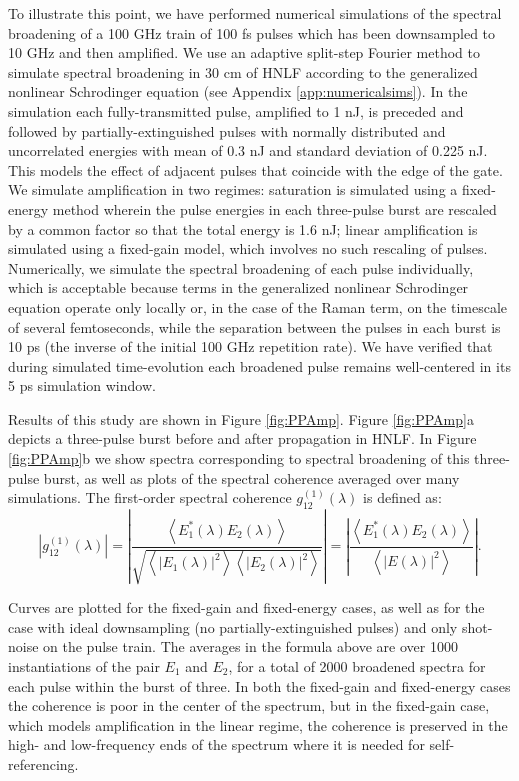 To illustrate this point, we have performed numerical simulations of the spectral broadening of a 100 GHz train of 100 fs pulses which has been downsampled to 10 GHz and then amplified. We use an adaptive \cite{Heidt2009} split-step Fourier method \cite{Hult2007} to simulate spectral broadening in 30 cm of HNLF according to the generalized nonlinear Schrodinger equation \cite{Agrawal2007} (see Appendix \ref{app:numericalsims}). In the simulation each fully-transmitted pulse, amplified to 1 nJ, is preceded and followed by partially-extinguished pulses with normally distributed and uncorrelated energies with mean of 0.3 nJ and standard deviation of 0.225 nJ. This models the effect of adjacent pulses that coincide with the edge of the gate. We simulate amplification in two regimes: saturation is simulated using a fixed-energy method wherein the pulse energies in each three-pulse burst are rescaled by a common factor so that the total energy is 1.6 nJ; linear amplification is simulated using a fixed-gain model, which involves no such rescaling of pulses. Numerically, we simulate the spectral broadening of each pulse individually, which is acceptable because terms in the generalized nonlinear Schrodinger equation operate only locally or, in the case of the Raman term, on the timescale of several femtoseconds, while the separation between the pulses in each burst is 10 ps (the inverse of the initial 100 GHz repetition rate).  We have verified that during simulated time-evolution each broadened pulse remains well-centered in its 5 ps simulation window. 

Results of this study are shown in Figure \ref{fig:PPAmp}. Figure \ref{fig:PPAmp}a depicts a three-pulse burst before and after propagation in HNLF. In Figure \ref{fig:PPAmp}b we show spectra corresponding to spectral broadening of this three-pulse burst, as well as plots of the spectral coherence averaged over many simulations. The first-order spectral coherence $g_{12}^{(1)} (\lambda)$ is defined as:
\begin{equation}
\left|g_{12}^{(1)} (\lambda)\right|=\left|\frac{\left<E_1^*(\lambda)E_2(\lambda)\right>}{\sqrt{\left<|E_1(\lambda)|^2\right>\left<|E_2(\lambda)|^2\right>}}\right|=\left|\frac{\left<E_1^*(\lambda)E_2(\lambda)\right>}{\left<|E(\lambda)|^2\right>}\right|.
\end{equation}

Curves are plotted for the fixed-gain and fixed-energy cases, as well as for the case with ideal downsampling (no partially-extinguished pulses) and only shot-noise on the pulse train. The averages in the formula above are over 1000 instantiations of the pair $E_1$ and $E_2$, for a total of 2000 broadened spectra for each pulse within the burst of three. In both the fixed-gain and fixed-energy cases the coherence is poor in the center of the spectrum, but in the fixed-gain case, which models amplification in the linear regime, the coherence is preserved in the high- and low-frequency ends of the spectrum where it is needed for self-referencing.

